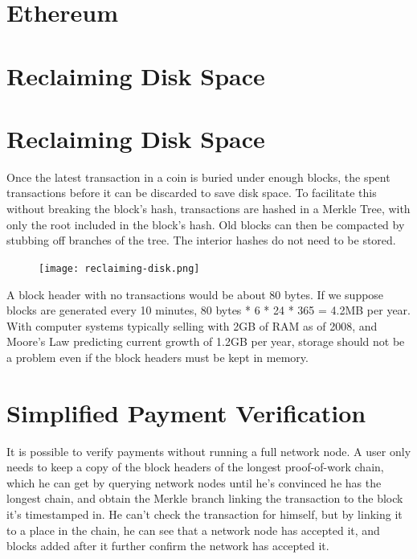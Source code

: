 \documentclass[a4paper, 10pt]{article}
\begin{document}
\section{Ethereum}\label{Ethereum}

\section{Reclaiming Disk Space}\label{reclaiming-disk-space}

\section{Reclaiming Disk Space}\label{reclaiming-disk-space}

Once the latest transaction in a coin is buried under enough blocks, the
spent transactions before it can be discarded to save disk space. To
facilitate this without breaking the block's hash, transactions are
hashed in a Merkle Tree\cite{mer80}\cite{mas99}\cite{hab97}, with only the root included in the block's hash. Old
blocks can then be compacted by stubbing off branches of the tree. The
interior hashes do not need to be stored.

\begin{figure}[!h]
\centering
\texttt{[image: reclaiming-disk.png]}
\end{figure}

A block header with no transactions would be about 80 bytes. If we
suppose blocks are generated every 10 minutes, 80 bytes * 6 * 24 * 365 =
4.2MB per year. With computer systems typically selling with 2GB of RAM
as of 2008, and Moore's Law predicting current growth of 1.2GB per year,
storage should not be a problem even if the block headers must be kept
in memory.

\newpage

\section{Simplified Payment
Verification}\label{simplified-payment-verification}

It is possible to verify payments without running a full network node. A
user only needs to keep a copy of the block headers of the longest
proof-of-work chain, which he can get by querying network nodes until
he's convinced he has the longest chain, and obtain the Merkle branch
linking the transaction to the block it's timestamped in. He can't check
the transaction for himself, but by linking it to a place in the chain,
he can see that a network node has accepted it, and blocks added after
it further confirm the network has accepted it.
\end{document}
